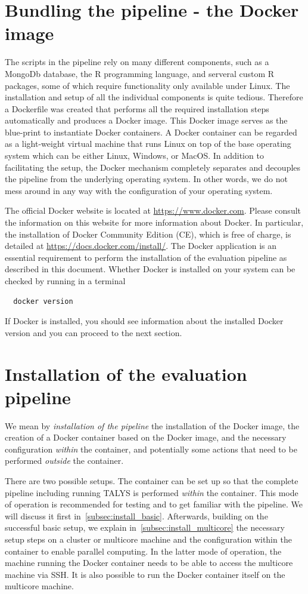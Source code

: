 \documentclass[12pt,a4paper]{scrartcl}
\begin{document}
\section{Bundling the pipeline - the Docker image} 
The scripts in the pipeline rely on many different components, such as a MongoDb database, the R programming language, and serveral custom R packages, some of which require functionality only available under Linux.
The installation and setup of all the individual components is quite tedious.
Therefore a Dockerfile was created that performs all the required installation steps automatically and produces a Docker image. This Docker image serves as the blue-print to instantiate Docker containers. A Docker container can be regarded as a light-weight virtual machine that runs Linux on top of the base operating system which can be either Linux, Windows, or MacOS.
In addition to facilitating the setup, the Docker mechanism completely separates and decouples the pipeline from the underlying operating  system.
In other words, we do not mess around in any way with the configuration of your operating system.

The official Docker website is located at \url{https://www.docker.com}.
Please consult the information on this website for more information about Docker.
In particular, the installation of Docker Community Edition (CE), which is free of charge, is detailed at \url{https://docs.docker.com/install/}.
The Docker application is an essential requirement to perform the installation of the evaluation pipeline as described in this document.
Whether Docker is installed on your system can be checked by running in a terminal
\begin{verbatim}
  docker version
\end{verbatim}
If Docker is installed, you should see information about the installed Docker version and you can proceed to the next section.

 \section{Installation of the evaluation pipeline}
We mean by \textit{installation of the pipeline} the installation of the Docker image, the creation of a Docker container based on the Docker image, and the necessary configuration \textit{within} the container, and potentially some actions that need to be performed \textit{outside} the container.

There are two possible setups.
The container can be set up so that the complete pipeline including running TALYS is performed \textit{within} the container. This mode of operation is recommended for testing and to get familiar with the pipeline. We will discuss it first in~\cref{subsec:install_basic}.
Afterwards, building on the successful basic setup, we explain in~\cref{subsec:install_multicore} the necessary setup steps on a cluster or multicore machine and the configuration within the container to enable parallel computing.
In the latter mode of operation, the machine running the Docker container needs to be able to access the multicore machine via SSH.
It is also possible to run the Docker container itself on the multicore machine.
\end{document}
